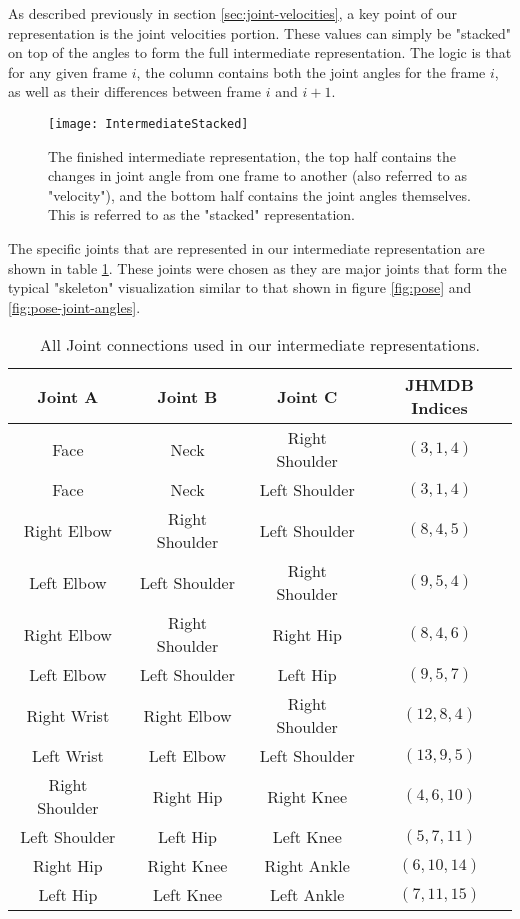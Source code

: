 As described previously in section \ref{sec:joint-velocities}, a key point of our representation is the joint velocities portion. These values can simply be "stacked" on top of the angles to form the full intermediate representation. The logic is that for any given frame $i$, the column contains both the joint angles for the frame $i$, as well as their differences between frame $i$ and $i+1$.

\begin{figure}[ht]
	\texttt{[image: IntermediateStacked]}
	\centering
	\caption{The finished intermediate representation, the top half contains the changes in joint angle from one frame to another (also referred to as "velocity"), and the bottom half contains the joint angles themselves. This is referred to as the "stacked" representation.}
	\label{fig:intermediate-stacked}
\end{figure}

The specific joints that are represented in our intermediate representation are shown in table \ref{tab:joint-connections}. These joints were chosen as they are major joints that form the typical "skeleton" visualization similar to that shown in figure \ref{fig:pose} and \ref{fig:pose-joint-angles}.

\begin{table}[ht]
	\centering
	\begin{tabular}{||c c c c||} 
		\hline
		\textbf{Joint A} & \textbf{Joint B} & \textbf{Joint C} & \textbf{JHMDB Indices} \\ [0.5ex] 
		\hline\hline
		Face & Neck & Right Shoulder & $(3, 1, 4)$ \\
		Face & Neck & Left Shoulder & $(3, 1, 4)$ \\
		\hline
		Right Elbow & Right Shoulder & Left Shoulder & $(8, 4, 5)$ \\
		Left Elbow & Left Shoulder & Right Shoulder & $(9, 5, 4)$ \\
		\hline
		Right Elbow & Right Shoulder & Right Hip & $(8, 4, 6)$ \\
		Left Elbow & Left Shoulder & Left Hip & $(9, 5, 7)$ \\
		\hline
		Right Wrist & Right Elbow & Right Shoulder & $(12, 8, 4)$ \\
		Left Wrist & Left Elbow & Left Shoulder & $(13, 9, 5)$ \\
		\hline
		Right Shoulder & Right Hip & Right Knee & $(4, 6, 10)$ \\
		Left Shoulder & Left Hip & Left Knee & $(5, 7, 11)$ \\
		\hline
		Right Hip & Right Knee & Right Ankle & $(6, 10, 14)$ \\
		Left Hip & Left Knee & Left Ankle & $(7, 11, 15)$ \\
		\hline
	\end{tabular}
	\caption{All Joint connections used in our intermediate representations.}
	\label{tab:joint-connections}
\end{table}

